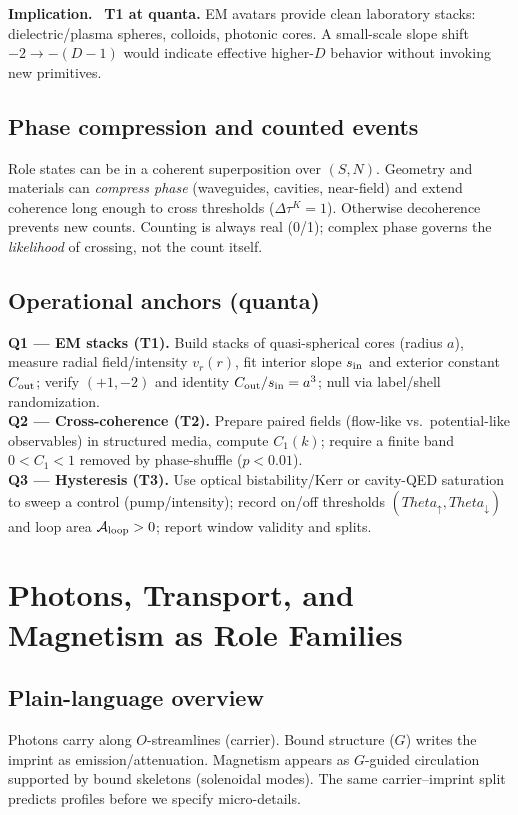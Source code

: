 \documentclass[12pt,a4paper,oneside]{scrreprt}
\def\Theta{Theta}%
\newenvironment{implication}{\par\vspace{0.5em}\noindent\textbf{Implication.}\ }{\par\vspace{0.5em}}
\begin{document}
\begin{implication}
\textbf{T1 at quanta.} EM avatars provide clean laboratory stacks: dielectric/plasma spheres, colloids, photonic cores. A small-scale slope shift $-2\to-(D-1)$ would indicate effective higher-$D$ behavior without invoking new primitives.
\end{implication}

\section{Phase compression and counted events}\label{sec:quanta-phase}
Role states can be in a coherent superposition over $(S,N)$. Geometry and materials can \emph{compress phase} (waveguides, cavities, near-field) and extend coherence long enough to cross thresholds ($\Delta\tau^K=1$). Otherwise decoherence prevents new counts. Counting is always real (0/1); complex phase governs the \emph{likelihood} of crossing, not the count itself.

\section{Operational anchors (quanta)}\label{sec:quanta-anchors}
\textbf{Q1 — EM stacks (T1).} Build stacks of quasi-spherical cores (radius $a$), measure radial field/intensity $v_r(r)$, fit interior slope $s_{\rm in}$ and exterior constant $C_{\rm out}$; verify $(+1,-2)$ and identity $C_{\rm out}/s_{\rm in}=a^3$; null via label/shell randomization.\\
\textbf{Q2 — Cross-coherence (T2).} Prepare paired fields (flow-like vs.\ potential-like observables) in structured media, compute $C_1(k)$; require a finite band $0<C_1<1$ removed by phase-shuffle ($p<0.01$).\\
\textbf{Q3 — Hysteresis (T3).} Use optical bistability/Kerr or cavity-QED saturation to sweep a control (pump/intensity); record on/off thresholds $(\Theta_\uparrow,\Theta_\downarrow)$ and loop area $\mathcal A_{\rm loop}>0$; report window validity and splits.

\chapter{Photons, Transport, and Magnetism as Role Families}\label{ch:quanta-families}

\section*{Plain-language overview}
Photons carry along $O$-streamlines (carrier). Bound structure ($G$) writes the imprint as emission/attenuation. Magnetism appears as $G$-guided circulation supported by bound skeletons (solenoidal modes). The same carrier–imprint split predicts profiles before we specify micro-details.
\end{document}
